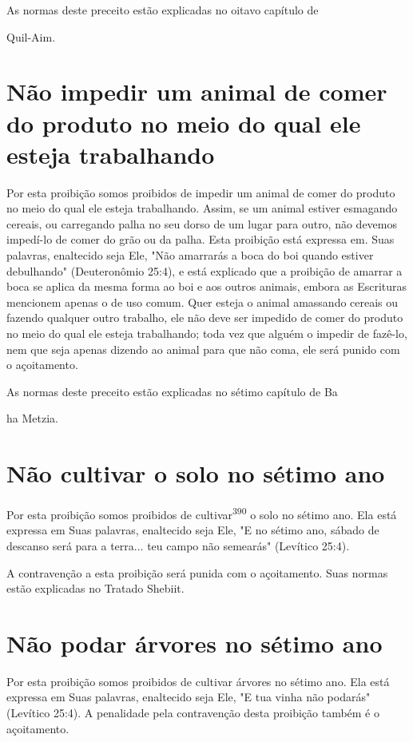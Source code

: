 \begin{itemize}
\begin{enumrate}
\begin{itemize}
\begin{itemize}
\begin{itemize}
As normas deste preceito estão explicadas no oitavo capítulo de


Quil-Aim.

\section{Não impedir um animal de comer do produto no meio do qual ele esteja trabalhando}

Por esta proibição somos proibidos de impedir um animal de comer do
produto no meio do qual ele esteja trabalhando. Assim, se um animal
esti­ver esmagando cereais, ou carregando palha no seu dorso de um lugar
para ou­tro, não devemos impedí-lo de comer do grão ou da palha. Esta
proibição está expressa em. Suas palavras, enaltecido seja Ele, "Não
amarrarás a boca do boi quando estiver debulhando" (Deuteronômio 25:4),
e está explicado que a proi­bição de amarrar a boca se aplica da mesma
forma ao boi e aos outros animais, embora as Escrituras mencionem apenas
o de uso comum. Quer esteja o ani­mal amassando cereais ou fazendo
qualquer outro trabalho, ele não deve ser impedido de comer do produto
no meio do qual ele esteja trabalhando; toda vez que alguém o impedir de
fazê-lo, nem que seja apenas dizendo ao animal para que não coma, ele
será punido com o açoitamento.


As normas deste preceito estão explicadas no sétimo capítulo de Ba


ha Metzia.

\section{Não cultivar o solo no sétimo ano}

Por esta proibição somos proibidos de cultivar\textsuperscript{390} o
solo no sétimo ano. Ela está expressa em Suas palavras, enaltecido seja
Ele, "E no sétimo ano, sábado de descanso será para a terra... teu campo
não semearás" (Levítico 25:4).

A contravenção a esta proibição será punida com o açoitamento. Suas
normas estão explicadas no Tratado Shebiit.


\section{Não podar árvores no sétimo ano}

Por esta proibição somos proibidos de cultivar árvores no sétimo ano.
Ela está expressa em Suas palavras, enaltecido seja Ele, "E tua vinha
não podarás" (Levítico 25:4). A penalidade pela contravenção desta
proibição tam­bém é o açoitamento.


\end{itemize}
\end{itemize}
\end{itemize}
\end{enumrate}
\end{itemize}
